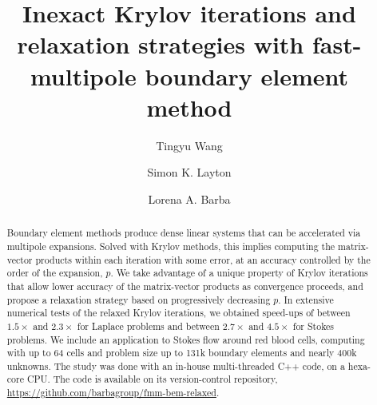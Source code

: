 \documentclass[final,3p,times]{elsarticle}
\begin{document}
\begin{frontmatter}



\title{Inexact Krylov iterations and relaxation strategies with fast-multipole boundary element method}


\author[gwu]{Tingyu Wang}

\author[bu,nvidia]{Simon K. Layton}

\author[gwu]{Lorena A. Barba}


\address[gwu]{Department of Mechanical and Aerospace Engineering, The George Washington University, Washington DC, 20052}
\address[bu]{Department of Mechanical Engineering, Boston University, Boston, MA, 02215}
\address[nvidia]{Nvidia, Corp., Santa Clara, CA}



\begin{abstract}
Boundary element methods produce dense linear systems that can be accelerated via multipole expansions. Solved with Krylov methods, this implies computing the matrix-vector products within each iteration with some error, at an accuracy controlled by the order of the expansion, $p$. We take advantage of a unique property of Krylov iterations that allow lower accuracy of the matrix-vector products as convergence proceeds, and propose a relaxation strategy based on progressively decreasing $p$. In extensive numerical tests of the relaxed Krylov iterations, we obtained speed-ups of between $1.5\times$ and $2.3\times$ for Laplace problems and between $2.7\times$ and $4.5\times$ for Stokes problems. We include an application to Stokes flow around red blood cells, computing with up to 64 cells and problem size up to 131k boundary elements and nearly 400k unknowns. The study was done with an in-house multi-threaded C++ code, on a hexa-core CPU. The code is available on its version-control repository, \href{https://github.com/barbagroup/fmm-bem-relaxed}{https://github.com/barbagroup/fmm-bem-relaxed}.
\end{abstract}


\end{frontmatter}
\end{document}
